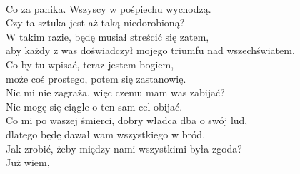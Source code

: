 \\

\charszam{}
Co za panika. Wszyscy w pośpiechu wychodzą.\\
Czy ta sztuka jest aż taką niedorobioną?\\
W takim razie, będę musiał streścić się zatem,\\
aby każdy z was doświadczył mojego triumfu nad wszechświatem.\\
Co by tu wpisać, teraz jestem bogiem,\\
może coś prostego, potem się zastanowię.\\
Nic mi nie zagraża, więc czemu mam was zabijać?\\
Nie mogę się ciągle o ten sam cel obijać.\\
Co mi po waszej śmierci, dobry władca dba o swój lud,\\
dlatego będę dawał wam wszystkiego w bród.\\
Jak zrobić, żeby między nami wszystkimi była zgoda?\\
Już wiem, \\











